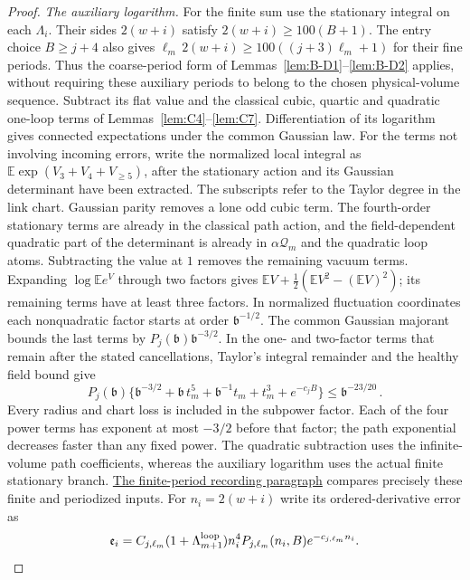 \begin{proof}
\emph{The auxiliary logarithm.} For the finite sum use the stationary integral on each $\Lambda_i$. Their sides $2(w+i)$ satisfy $2(w+i)\ge100(B+1)$. The entry choice $B\ge j+4$ also gives $\ell_m\,2(w+i)\ge100((j+3)\ell_m+1)$ for their fine periods. Thus the coarse-period form of Lemmas~\ref{lem:B-D1}--\ref{lem:B-D2} applies, without requiring these auxiliary periods to belong to the chosen physical-volume sequence. Subtract its flat value and the classical cubic, quartic and quadratic one-loop terms of Lemmas~\ref{lem:C4}--\ref{lem:C7}. Differentiation of its logarithm gives connected expectations under the common Gaussian law. For the terms not involving incoming errors, write the normalized local integral as $\mathbb E\exp(V_3+V_4+V_{\ge5})$, after the stationary action and its Gaussian determinant have been extracted. The subscripts refer to the Taylor degree in the link chart. Gaussian parity removes a lone odd cubic term. The fourth-order stationary terms are already in the classical path action, and the field-dependent quadratic part of the determinant is already in $\alpha\mathcal Q_m$ and the quadratic loop atoms. Subtracting the value at $1$ removes the remaining vacuum terms. Expanding $\log\mathbb E e^V$ through two factors gives $\mathbb EV+\frac12(\mathbb EV^2-(\mathbb EV)^2)$; its remaining terms have at least three factors. In normalized fluctuation coordinates each nonquadratic factor starts at order $\mathfrak b^{-1/2}$. The common Gaussian majorant bounds the last terms by $P_j(\mathfrak b)\mathfrak b^{-3/2}$. In the one- and two-factor terms that remain after the stated cancellations, Taylor's integral remainder and the healthy field bound give
\begin{equation*}
P_j(\mathfrak b)\{\mathfrak b^{-3/2}+\mathfrak b\,t_m^5+\mathfrak b^{-1}t_m+t_m^3+e^{-c_jB}\}
\le \mathfrak b^{-23/20}\,.
\end{equation*}
Every radius and chart loss is included in the subpower factor. Each of the four power terms has exponent at most $-3/2$ before that factor; the path exponential decreases faster than any fixed power. The quadratic subtraction uses the infinite-volume path coefficients, whereas the auxiliary logarithm uses the actual finite stationary branch. \hyperref[par:C-finite-period]{The finite-period recording paragraph} compares precisely these finite and periodized inputs. For $n_i=2(w+i)$ write its ordered-derivative error as
\begin{equation*}
\mathfrak e_i=C_{j,\ell_m}(1+\Lambda_{m+1}^{\rm loop})n_i^4P_{j,\ell_m}(n_i,B)e^{-c_{j,\ell_m}n_i}.

\end{equation*}
\end{proof}
